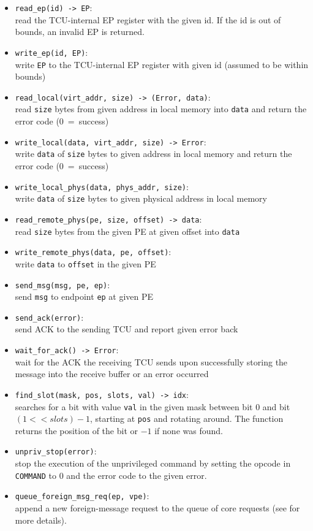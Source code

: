 \begin{itemize}
  \item \texttt{read\_ep(id) -> EP}:\\
  read the TCU-internal EP register with the given id. If the id is out of bounds, an invalid EP is
  returned.
  \item \texttt{write\_ep(id, EP)}:\\
  write \texttt{EP} to the TCU-internal EP register with given id (assumed to be within bounds)
  \item \texttt{read\_local(virt\_addr, size) -> (Error, data)}:\\
  read \texttt{size} bytes from given address in local memory into \texttt{data} and return the error
  code (0~=~success)
  \item \texttt{write\_local(data, virt\_addr, size) -> Error}:\\
  write \texttt{data} of \texttt{size} bytes to given address in local memory and return the error
  code (0~=~success)
  \item \texttt{write\_local\_phys(data, phys\_addr, size)}:\\
  write \texttt{data} of \texttt{size} bytes to given physical address in local memory
  \item \texttt{read\_remote\_phys(pe, size, offset) -> data}:\\
  read \texttt{size} bytes from the given PE at given offset into \texttt{data}
  \item \texttt{write\_remote\_phys(data, pe, offset)}:\\
  write \texttt{data} to \texttt{offset} in the given PE
  \item \texttt{send\_msg(msg, pe, ep)}:\\
  send \texttt{msg} to endpoint \texttt{ep} at given PE
  \item \texttt{send\_ack(error)}:\\
  send ACK to the sending TCU and report given error back
  \item \texttt{wait\_for\_ack() -> Error}:\\
  wait for the ACK the receiving TCU sends upon successfully storing the message into the receive
  buffer or an error occurred
  \item \texttt{find\_slot(mask, pos, slots, val) -> idx}:\\
  searches for a bit with value \texttt{val} in the given mask between bit 0 and bit $(1 << slots) -
  1$, starting at \texttt{pos} and rotating around. The function returns the position of the bit or
  $-1$ if none was found.
  \item \texttt{unpriv\_stop(error)}:\\
  stop the execution of the unprivileged command by setting the opcode in \texttt{COMMAND} to 0 and
  the error code to the given error.
  \item \texttt{queue\_foreign\_msg\_req(ep, vpe)}:\\
  append a new foreign-message request to the queue of core requests (see
   for more details). \extend{}
\end{itemize}

